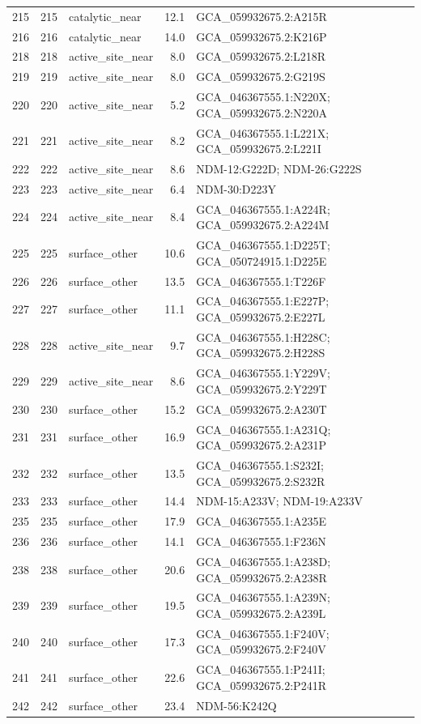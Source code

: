 \begin{longtable}{rrlrl}
215&215&catalytic\_near&12.1&GCA\_059932675.2:A215R\\
216&216&catalytic\_near&14.0&GCA\_059932675.2:K216P\\
218&218&active\_site\_near&8.0&GCA\_059932675.2:L218R\\
219&219&active\_site\_near&8.0&GCA\_059932675.2:G219S\\
220&220&active\_site\_near&5.2&GCA\_046367555.1:N220X; GCA\_059932675.2:N220A\\
221&221&active\_site\_near&8.2&GCA\_046367555.1:L221X; GCA\_059932675.2:L221I\\
222&222&active\_site\_near&8.6&NDM-12:G222D; NDM-26:G222S\\
223&223&active\_site\_near&6.4&NDM-30:D223Y\\
224&224&active\_site\_near&8.4&GCA\_046367555.1:A224R; GCA\_059932675.2:A224M\\
225&225&surface\_other&10.6&GCA\_046367555.1:D225T; GCA\_050724915.1:D225E\\
226&226&surface\_other&13.5&GCA\_046367555.1:T226F\\
227&227&surface\_other&11.1&GCA\_046367555.1:E227P; GCA\_059932675.2:E227L\\
228&228&active\_site\_near&9.7&GCA\_046367555.1:H228C; GCA\_059932675.2:H228S\\
229&229&active\_site\_near&8.6&GCA\_046367555.1:Y229V; GCA\_059932675.2:Y229T\\
230&230&surface\_other&15.2&GCA\_059932675.2:A230T\\
231&231&surface\_other&16.9&GCA\_046367555.1:A231Q; GCA\_059932675.2:A231P\\
232&232&surface\_other&13.5&GCA\_046367555.1:S232I; GCA\_059932675.2:S232R\\
233&233&surface\_other&14.4&NDM-15:A233V; NDM-19:A233V\\
235&235&surface\_other&17.9&GCA\_046367555.1:A235E\\
236&236&surface\_other&14.1&GCA\_046367555.1:F236N\\
238&238&surface\_other&20.6&GCA\_046367555.1:A238D; GCA\_059932675.2:A238R\\
239&239&surface\_other&19.5&GCA\_046367555.1:A239N; GCA\_059932675.2:A239L\\
240&240&surface\_other&17.3&GCA\_046367555.1:F240V; GCA\_059932675.2:F240V\\
241&241&surface\_other&22.6&GCA\_046367555.1:P241I; GCA\_059932675.2:P241R\\
242&242&surface\_other&23.4&NDM-56:K242Q\\

\end{longtable}
